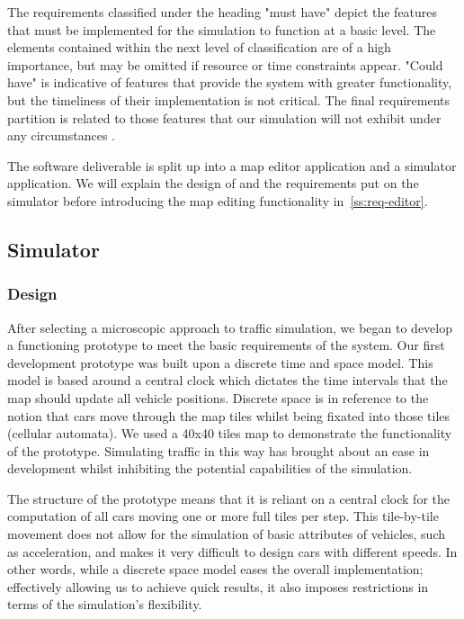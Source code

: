 The requirements classified under the heading "must have" depict the features that must be implemented for the simulation to function at a basic level. The elements contained within the next level of classification are of a high importance, but may be omitted if resource or time constraints appear. "Could have" is indicative of features that provide the system with greater functionality, but the timeliness of their implementation is not critical. The final requirements partition is related to those features that our simulation will not exhibit under any circumstances \cite{d2014introduction}. 

The software deliverable is split up into a map editor application and a simulator application. We will explain the design of and the requirements put on the simulator before introducing the map editing functionality in~\ref{ss:req-editor}.

\subsection{Simulator}
\subsubsection{Design}
\label{subsec:design}
After selecting a microscopic approach to traffic simulation, we began to develop a functioning prototype to meet the basic requirements of the system. Our first development prototype was built upon a discrete time and space model. This model is based around a central clock which dictates the time intervals that the map should update all vehicle positions. Discrete space is in reference to the notion that cars move through the map tiles whilst being fixated into those tiles (cellular automata). We used a 40x40 tiles map to demonstrate the functionality of the prototype. Simulating traffic in this way has brought about an ease in development whilst inhibiting the potential capabilities of the simulation.

The structure of the prototype means that it is reliant on a central clock for the computation of all cars moving one or more full tiles per step. This tile-by-tile movement does not allow for the simulation of basic attributes of vehicles, such as acceleration, and makes it very difficult to design cars with different speeds. In other words, while a discrete space model eases the overall implementation; effectively allowing us to achieve quick results, it also imposes restrictions in terms of the simulation's flexibility.

